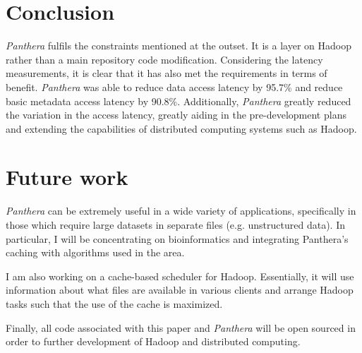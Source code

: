 \documentclass[12pt]{article}
\begin{document}
\section{Conclusion}

\textit{Panthera} fulfils the constraints mentioned at the outset. It is a layer on Hadoop rather than a main repository code modification. Considering the latency measurements, it is clear that it has also met the requirements in terms of benefit. \textit{Panthera} was able to reduce data access latency by 95.7\% and reduce basic metadata access latency by 90.8\%. Additionally, \textit{Panthera} greatly reduced the variation in the access latency, greatly aiding in the pre-development plans and extending the capabilities of distributed computing systems such as Hadoop.

\section{Future work}
\textit{Panthera} can be extremely useful in a wide variety of applications, specifically in those which require large datasets in separate files (e.g. unstructured data). In particular, I will be concentrating on bioinformatics and integrating Panthera's caching with algorithms used in the area.

I am also working on a cache-based scheduler for Hadoop. Essentially, it will use information about what files are available in various clients and arrange Hadoop tasks such that the use of the cache is maximized.

Finally, all code associated with this paper and \textit{Panthera} will be open sourced in order to further development of Hadoop and distributed computing.

\nocite{*}



\end{document}
